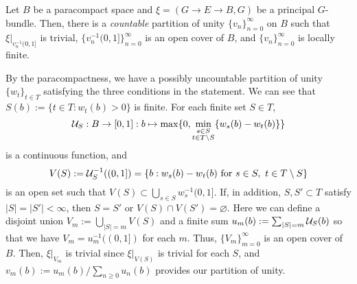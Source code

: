 \documentclass{../../../small}
\begin{document}
\begin{lem*}[3.6]
Let $B$ be a paracompact space and $\xi=(G\to E\to B,G)$ be a principal $G$-bundle.
Then, there is a \emph{countable} partition of unity $\{v_n\}_{n=0}^\infty$ on $B$ such that $\xi|_{v_n^{-1}(0,1]}$ is trivial, $\{v_n^{-1}(0,1]\}_{n=0}^\infty$ is an open cover of $B$, and $\{v_n\}_{n=0}^\infty$ is locally finite.
\end{lem*}
\begin{pf}
By the paracompactness, we have a possibly uncountable partition of unity $\{w_t\}_{t\in T}$ satisfying the three conditions in the statement.
We can see that $S(b):=\{t\in T:w_t(b)>0\}$ is finite.
For each finite set $S\in T$,
\[\mathcal{U}_S:B\to[0,1]:b\mapsto\max\{0,\min_{\substack{s\in S\\t\in T\setminus S}}\{w_s(b)-w_t(b)\}\}\]
is a continuous function, and
\[V(S):=\mathcal{U}_S^{-1}((0,1])=\{b:w_s(b)-w_t(b)\text{ for }s\in S,\ t\in T\setminus S\}\]
is an open set such that $V(S)\subset\bigcup_{s\in S}w_s^{-1}(0,1]$.
If, in addition, $S,S'\subset T$ satisfy $|S|=|S'|<\infty$, then $S=S'$ or $V(S)\cap V(S')=\varnothing$.
Here we can define a disjoint union $V_m:=\bigcup_{|S|=m}V(S)$ and a finite sum $u_m(b):=\sum_{|S|=m}\mathcal{U}_S(b)$ so that we have $V_m=u_m^{-1}((0,1])$ for each $m$.
Thus, $\{V_m\}_{m=0}^\infty$ is an open cover of $B$.
Then, $\xi|_{V_m}$ is trivial since $\xi|_{V(S)}$ is trivial for each $S$, and $v_m(b):=u_m(b)/\sum_{n\ge0}u_n(b)$ provides our partition of unity.
\end{pf}
\end{document}
